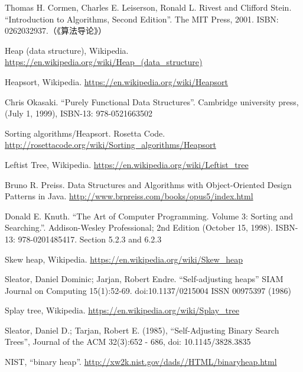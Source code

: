 \documentclass[b5paper]{ctexart}
\begin{document}
\begin{thebibliography}{99}

Thomas H. Cormen, Charles E. Leiserson, Ronald L. Rivest and Clifford Stein. ``Introduction to Algorithms, Second Edition''. The MIT Press, 2001. ISBN: 0262032937.（《算法导论》）

Heap (data structure), Wikipedia. \url{https://en.wikipedia.org/wiki/Heap_(data_structure)}

Heapsort, Wikipedia. \url{https://en.wikipedia.org/wiki/Heapsort}

Chris Okasaki. ``Purely Functional Data Structures''. Cambridge university press, (July 1, 1999), ISBN-13: 978-0521663502

Sorting algorithms/Heapsort. Rosetta Code. \url{http://rosettacode.org/wiki/Sorting_algorithms/Heapsort}

Leftist Tree, Wikipedia. \url{https://en.wikipedia.org/wiki/Leftist_tree}

Bruno R. Preiss. Data Structures and Algorithms with Object-Oriented Design Patterns in Java. \url{http://www.brpreiss.com/books/opus5/index.html}

Donald E. Knuth. ``The Art of Computer Programming. Volume 3: Sorting and Searching.''. Addison-Wesley Professional;
2nd Edition (October 15, 1998). ISBN-13: 978-0201485417. Section 5.2.3 and 6.2.3

Skew heap, Wikipedia. \url{https://en.wikipedia.org/wiki/Skew_heap}

Sleator, Daniel Dominic; Jarjan, Robert Endre. ``Self-adjusting heaps'' SIAM Journal on Computing 15(1):52-69. doi:10.1137/0215004 ISSN 00975397 (1986)

Splay tree, Wikipedia. \url{https://en.wikipedia.org/wiki/Splay_tree}

Sleator, Daniel D.; Tarjan, Robert E. (1985), ``Self-Adjusting Binary Search Trees'', Journal of the ACM 32(3):652 - 686, doi: 10.1145/3828.3835

NIST, ``binary heap''. \url{http://xw2k.nist.gov/dads//HTML/binaryheap.html}

\end{thebibliography}
\end{document}
